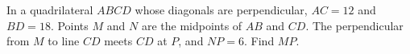 In a quadrilateral $ABCD$ whose diagonals are perpendicular, $AC=12$ and $BD=18$. Points $M$ and $N$ are the midpoints of $AB$ and $CD$. The perpendicular from $M$ to line $CD$ meets $CD$ at $P$, and $NP=6$. Find $MP$.
